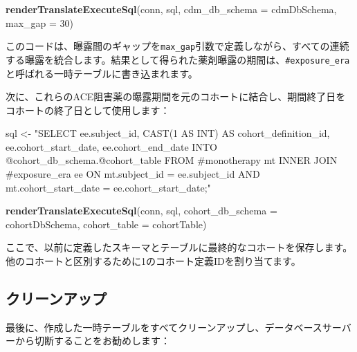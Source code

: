\documentclass[
  11pt]{book}
\newenvironment{Shaded}{\begin{snugshade}}{\end{snugshade}}
\newcommand{\AttributeTok}[1]{\textcolor[rgb]{0.13,0.29,0.53}{#1}}
\newcommand{\DecValTok}[1]{\textcolor[rgb]{0.00,0.00,0.81}{#1}}
\newcommand{\FunctionTok}[1]{\textcolor[rgb]{0.13,0.29,0.53}{\textbf{#1}}}
\newcommand{\NormalTok}[1]{#1}
\newcommand{\OtherTok}[1]{\textcolor[rgb]{0.56,0.35,0.01}{#1}}
\newcommand{\StringTok}[1]{\textcolor[rgb]{0.31,0.60,0.02}{#1}}
\theoremstyle{definition}
\theoremstyle{definition}
\theoremstyle{definition}
\theoremstyle{definition}
\theoremstyle{remark}
\begin{document}
\begin{Shaded}
\begin{Highlighting}[]
\FunctionTok{renderTranslateExecuteSql}\NormalTok{(conn,}
\NormalTok{                          sql,}
                          \AttributeTok{cdm\_db\_schema =}\NormalTok{ cdmDbSchema,}
                          \AttributeTok{max\_gap =} \DecValTok{30}\NormalTok{)}
\end{Highlighting}
\end{Shaded}

このコードは、曝露間のギャップを\texttt{max\_gap}引数で定義しながら、すべての連続する曝露を統合します。結果として得られた薬剤曝露の期間は、\texttt{\#exposure\_era}と呼ばれる一時テーブルに書き込まれます。

次に、これらのACE阻害薬の曝露期間を元のコホートに結合し、期間終了日をコホートの終了日として使用します：

\begin{Shaded}
\begin{Highlighting}[]
\NormalTok{sql }\OtherTok{\textless{}{-}} \StringTok{"SELECT ee.subject\_id,}
\StringTok{  CAST(1 AS INT) AS cohort\_definition\_id,}
\StringTok{  ee.cohort\_start\_date,}
\StringTok{  ee.cohort\_end\_date}
\StringTok{INTO @cohort\_db\_schema.@cohort\_table}
\StringTok{FROM \#monotherapy mt}
\StringTok{INNER JOIN \#exposure\_era ee}
\StringTok{  ON mt.subject\_id = ee.subject\_id}
\StringTok{    AND mt.cohort\_start\_date = ee.cohort\_start\_date;"}

\FunctionTok{renderTranslateExecuteSql}\NormalTok{(conn,}
\NormalTok{                          sql,}
                          \AttributeTok{cohort\_db\_schema =}\NormalTok{ cohortDbSchema,}
                          \AttributeTok{cohort\_table =}\NormalTok{ cohortTable)}
\end{Highlighting}
\end{Shaded}

ここで、以前に定義したスキーマとテーブルに最終的なコホートを保存します。他のコホートと区別するために1のコホート定義IDを割り当てます。

\subsection{クリーンアップ}\label{ux30afux30eaux30fcux30f3ux30a2ux30c3ux30d7-1}

最後に、作成した一時テーブルをすべてクリーンアップし、データベースサーバーから切断することをお勧めします：
\end{document}
